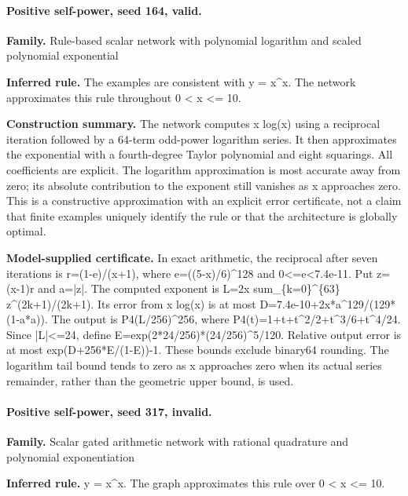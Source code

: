 \paragraph{Positive self-power, seed 164, valid.}

\textbf{Family.} Rule-based scalar network with polynomial logarithm and scaled polynomial exponential


\textbf{Inferred rule.} The examples are consistent with y = x\textasciicircum{}x. The network approximates this rule throughout 0 < x <= 10.


\textbf{Construction summary.} The network computes x log(x) using a reciprocal iteration followed by a 64-term odd-power logarithm series. It then approximates the exponential with a fourth-degree Taylor polynomial and eight squarings. All coefficients are explicit. The logarithm approximation is most accurate away from zero; its absolute contribution to the exponent still vanishes as x approaches zero. This is a constructive approximation with an explicit error certificate, not a claim that finite examples uniquely identify the rule or that the architecture is globally optimal.


\textbf{Model-supplied certificate.} In exact arithmetic, the reciprocal after seven iterations is r=(1-e)/(x+1), where e=((5-x)/6)\textasciicircum{}128 and 0<=e<7.4e-11. Put z=(x-1)r and a=|z|. The computed exponent is L=2x sum\_\{k=0\}\textasciicircum{}\{63\} z\textasciicircum{}(2k+1)/(2k+1). Its error from x log(x) is at most D=7.4e-10+2x*a\textasciicircum{}129/(129*(1-a*a)). The output is P4(L/256)\textasciicircum{}256, where P4(t)=1+t+t\textasciicircum{}2/2+t\textasciicircum{}3/6+t\textasciicircum{}4/24. Since |L|<=24, define E=exp(2*24/256)*(24/256)\textasciicircum{}5/120. Relative output error is at most exp(D+256*E/(1-E))-1. These bounds exclude binary64 rounding. The logarithm tail bound tends to zero as x approaches zero when its actual series remainder, rather than the geometric upper bound, is used.


\paragraph{Positive self-power, seed 317, invalid.}

\textbf{Family.} Scalar gated arithmetic network with rational quadrature and polynomial exponentiation


\textbf{Inferred rule.} y = x\textasciicircum{}x. The graph approximates this rule over 0 < x <= 10.


